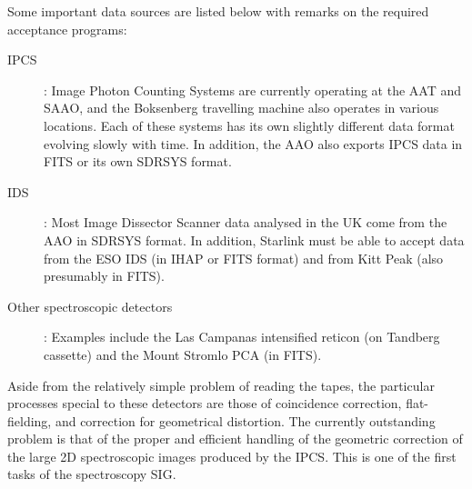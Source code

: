 Some important data sources are listed below with remarks on the required
acceptance programs:
\begin{description}
\begin{description}
\item [IPCS]: Image Photon Counting Systems are currently operating at the AAT
and SAAO, and the Boksenberg travelling machine also operates in various
locations.
Each of these systems has its own slightly different data format evolving
slowly with time.
In addition, the AAO also exports IPCS data in FITS or its own SDRSYS format.
\item [IDS]: Most Image Dissector Scanner data analysed in the UK come from the
AAO in SDRSYS format.
In addition, Starlink must be able to accept data from the ESO IDS (in IHAP or
FITS format) and from Kitt Peak (also presumably in FITS).
\item [Other spectroscopic detectors]: Examples include the Las Campanas
intensified reticon (on Tandberg cassette) and the Mount Stromlo PCA (in FITS).
\end{description}
\end{description}
Aside from the relatively simple problem of reading the tapes, the particular
processes special to these detectors are those of coincidence correction,
flat-fielding, and correction for geometrical distortion.
The currently outstanding problem is that of the proper and efficient handling
of the geometric correction of the large 2D spectroscopic images produced by the
IPCS.
This is one of the first tasks of the spectroscopy SIG.
